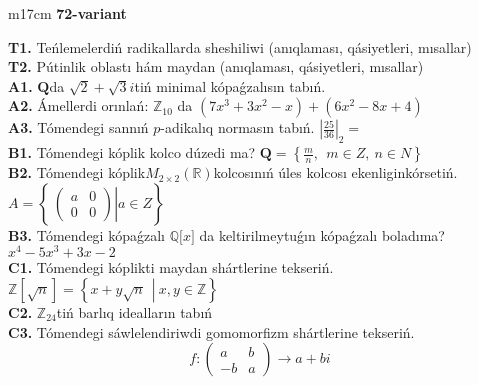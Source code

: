 \documentclass{article}
\begin{document}
\begin{tabular}{m{17cm}}
\textbf{72-variant}
\newline

\textbf{T1.} Teńlemelerdiń radikallarda sheshiliwi (anıqlaması, qásiyetleri, mısallar) \\
\textbf{T2.} Pútinlik oblastı hám maydan (anıqlaması, qásiyetleri, mısallar) \\
\textbf{A1.} \(\mathbf{Q}\)da \(\sqrt{2} + \sqrt{3}i\)tiń minimal kópaǵzalısın tabıń. \\
\textbf{A2.} Ámellerdi orınlań: \(\mathbb{Z}_{10}\) da \(\left( 7x^{3} + 3x^{2} - x \right) + \left( 6x^{2} - 8x + 4 \right)\) \\
\textbf{A3.} Tómendegi sannıń \(p\)-adikalıq normasın tabıń. \(|\frac{25}{36}|_{2} =\) \\
\textbf{B1.} Tómendegi kóplik kolco dúzedi ma? \(\mathbf{Q} = \left\{ \frac{m}{n},\ \ m \in Z,\ n \in N \right\}\) \\
\textbf{B2.} Tómendegi kóplik\(M_{2 \times 2}\left( \mathbb{R} \right)\)kolcosınıń úles kolcosı ekenliginkórsetiń. \(A = \left\{ \left. \ \begin{pmatrix}
a & 0 \\
0 & 0
\end{pmatrix} \right|a \in Z \right\}\) \\
\textbf{B3.} Tómendegi kópaǵzalı \(\mathbb{Q\lbrack}x\rbrack\) da keltirilmeytuǵın kópaǵzalı boladıma? \(x^{4} - 5x^{3} + 3x - 2\) \\
\textbf{C1.} Tómendegi kóplikti maydan shártlerine tekseriń. \(\mathbb{Z}\left\lbrack \sqrt{n} \right\rbrack = \left\{ x + y\sqrt{n}\ \ \left| \right.\ x,y \in \mathbb{Z} \right\}\) \\
\textbf{C2.} \(\mathbb{Z}_{24}\)tiń barlıq idealların tabıń \\
\textbf{C3.} Tómendegi sáwlelendiriwdi gomomorfizm shártlerine tekseriń.
\[f:\begin{pmatrix}
a & b \\
 - b & a
\end{pmatrix} \rightarrow a + bi\] \\

\end{tabular}
\vspace{1cm}
\end{document}
